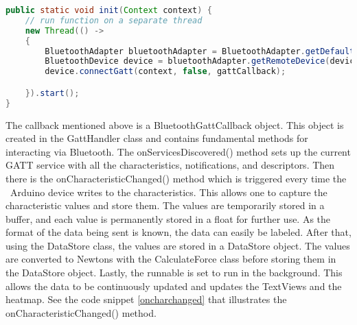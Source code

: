 \begin{lstlisting}[language=java,caption=init method in the GattHandler class, label=gattinit]
  public static void init(Context context) {
    // run function on a separate thread
    new Thread(() ->
    {
        BluetoothAdapter bluetoothAdapter = BluetoothAdapter.getDefaultAdapter(); // use to perform fundamental Bluetooth tasks
        BluetoothDevice device = bluetoothAdapter.getRemoteDevice(deviceMAC); // specify our device MAC
        device.connectGatt(context, false, gattCallback);

    }).start();
}
\end{lstlisting}
The callback mentioned above is a BluetoothGattCallback object. This object is created in the GattHandler class and contains fundamental methods for interacting via Bluetooth. The onServicesDiscovered() method sets up the current GATT service with all the characteristics, notifications, and descriptors. Then there is the onCharacteristicChanged() method which is triggered every time the \ Arduino device writes to the characteristics. This allows one to capture the characteristic values and store them. The values are temporarily stored in a buffer, and each value is permanently stored in a float for further use. As the format of the data being sent is known, the data can easily be labeled. After that, using the DataStore class, the values are stored in a DataStore object. The values are converted to Newtons with the CalculateForce class before storing them in the DataStore object. Lastly, the runnable is set to run in the background. This allows the data to be continuously updated and updates the TextViews and the heatmap. See the code snippet \ref{oncharchanged} that illustrates the onCharacteristicChanged() method.
\clearpage
